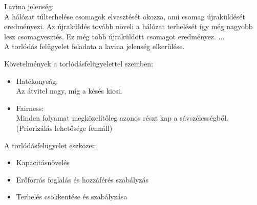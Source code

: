 \documentclass[margin=0px]{article}
\begin{document}
\begin{description}
				Lavina jelenség: \\
				A hálózat túlterhelése csomagok elvesztését okozza, ami csomag újraküldését eredményezi. Az újraküldés tovább növeli a hálózat terhelését így még nagyobb lesz csomagvesztés. Ez még több újraküldött csomagot eredményez. ... \\
				A torlódás felügyelet feladata a lavina jelenség elkerülése.
				
				Követelmények a torlódásfelügyelettel szemben:
				\begin{itemize}
					\item Hatékonyság: \\
						Az átvitel nagy, míg a késés kicsi.
					\item Fairness: \\
						Minden folyamat megközelítőleg azonos részt kap a sávszélességből. (Priorizálás lehetősége fennáll)
				\end{itemize}
				
				A torlódásfelügyelet eszközei:
				\begin{itemize}
					\item Kapacitásnövelés
					\item Erőforrás foglalás és hozzáférés szabályzás
					\item Terhelés csökkentése és szabályzása
				\end{itemize}
				

\end{description}
\end{document}
